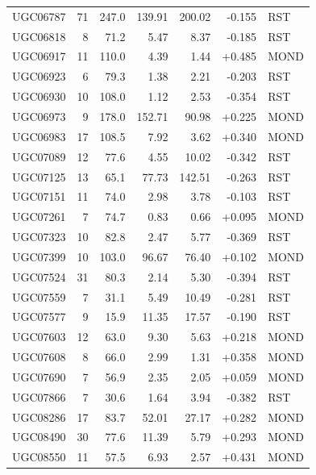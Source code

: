 \documentclass[11pt,a4paper]{article}
\begin{document}
\begin{longtable}{lrrrrrl}
UGC06787             &  71 &  247.0 &   139.91 &   200.02 & -0.155 & RST \\
UGC06818             &   8 &   71.2 &     5.47 &     8.37 & -0.185 & RST \\
UGC06917             &  11 &  110.0 &     4.39 &     1.44 & +0.485 & MOND \\
UGC06923             &   6 &   79.3 &     1.38 &     2.21 & -0.203 & RST \\
UGC06930             &  10 &  108.0 &     1.12 &     2.53 & -0.354 & RST \\
UGC06973             &   9 &  178.0 &   152.71 &    90.98 & +0.225 & MOND \\
UGC06983             &  17 &  108.5 &     7.92 &     3.62 & +0.340 & MOND \\
UGC07089             &  12 &   77.6 &     4.55 &    10.02 & -0.342 & RST \\
UGC07125             &  13 &   65.1 &    77.73 &   142.51 & -0.263 & RST \\
UGC07151             &  11 &   74.0 &     2.98 &     3.78 & -0.103 & RST \\
UGC07261             &   7 &   74.7 &     0.83 &     0.66 & +0.095 & MOND \\
UGC07323             &  10 &   82.8 &     2.47 &     5.77 & -0.369 & RST \\
UGC07399             &  10 &  103.0 &    96.67 &    76.40 & +0.102 & MOND \\
UGC07524             &  31 &   80.3 &     2.14 &     5.30 & -0.394 & RST \\
UGC07559             &   7 &   31.1 &     5.49 &    10.49 & -0.281 & RST \\
UGC07577             &   9 &   15.9 &    11.35 &    17.57 & -0.190 & RST \\
UGC07603             &  12 &   63.0 &     9.30 &     5.63 & +0.218 & MOND \\
UGC07608             &   8 &   66.0 &     2.99 &     1.31 & +0.358 & MOND \\
UGC07690             &   7 &   56.9 &     2.35 &     2.05 & +0.059 & MOND \\
UGC07866             &   7 &   30.6 &     1.64 &     3.94 & -0.382 & RST \\
UGC08286             &  17 &   83.7 &    52.01 &    27.17 & +0.282 & MOND \\
UGC08490             &  30 &   77.6 &    11.39 &     5.79 & +0.293 & MOND \\
UGC08550             &  11 &   57.5 &     6.93 &     2.57 & +0.431 & MOND \\

\end{longtable}
\end{document}
